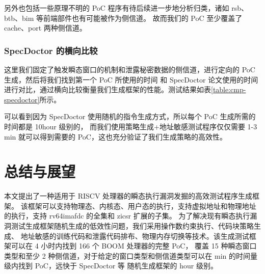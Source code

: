 另外也包括一些原理不明的 PoC 程序有待后续进一步地分析归类，诸如 rsb、btb、bim 等前端部件也有可能被作为侧信道。
故而我们的 PoC 至少覆盖了 cache、port 两种侧信道。\par

\subsubsection{SpecDoctor 的横向比较}

这里我们固定了触发瞬态窗口的机制和泄露秘密数据的侧信道，进行定向的 PoC 生成，然后将我们找到第一个 PoC 所使用的时间
和 SpecDoctor 论文使用的时间进行对比，通过横向比较衡量我们生成框架的性能。测试结果如表\ref{table:cmp-specdoctor}所示。\par

\begin{table}[h!]
    \begin{center} 
    \caption{与 SpecDoctor 的性能比较} 
    \label{table:cmp-specdoctor}  
    \end{center}
\end{table}

可以看到因为 SpecDoctor 使用随机的指令生成方式，所以每个 PoC 生成所需的时间都是 10hour 级别的，
而我们使用策略生成+地址敏感测试程序仅仅需要 1-3 min 就可以得到需要的 PoC，这也充分验证了我们生成策略的高效性。\par

\cleardoublepage
\section{总结与展望}

本文提出了一种适用于 RISCV 处理器的瞬态执行漏洞发掘的高效测试程序生成框架。
该框架可以支持物理态、内核态、用户态的执行，支持虚拟地址和物理地址的执行，支持 rv64imafdc 的全集和 zicsr 扩展的子集。
为了解决现有瞬态执行漏洞测试生成框架随机生成的低效性问题，我们采用操作数约束执行、代码块策略生成、
地址敏感的训练代码和泄露代码排布、物理内存切换等技术。该生成测试框架可以在 4 小时内找到 166 个 BOOM 处理器的完整 PoC，
覆盖 15 种瞬态窗口类型和至少 2 种侧信道，对于给定的窗口类型和侧信道类型可以在 min 的时间量级内找到 PoC，远快于 SpecDoctor 等
随机生成框架的 hour 级别。\par

